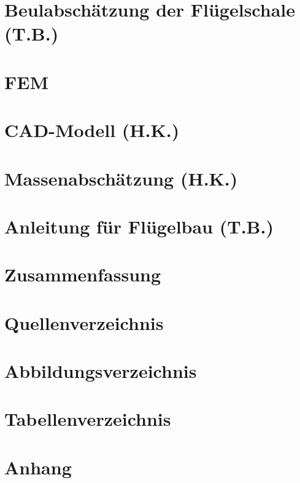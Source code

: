 \documentclass[a4paper,twoside,11pt]{article}
\begin{document}
\section{Beulabschätzung der Flügelschale (T.B.)}

\newpage
\section{FEM}

\newpage
\section{CAD-Modell (H.K.)}

\newpage
\section{Massenabschätzung (H.K.)}

\newpage
\section{Anleitung für Flügelbau (T.B.)}

\newpage
\section{Zusammenfassung}

\newpage
\section{Quellenverzeichnis}

\newpage
\section{Abbildungsverzeichnis}
\listoffigures
\newpage
\section{Tabellenverzeichnis}
\listoftables
\newpage
\section{Anhang}

\end{document}
